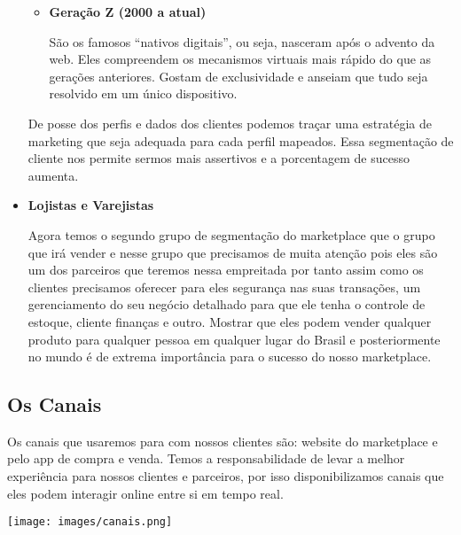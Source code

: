 \documentclass[a4paper]{article}
\begin{document}
\begin{itemize}
\begin{itemize}
        \item \textbf{Geração Z (2000  a atual)}
        \par São os famosos “nativos digitais”, ou seja, nasceram após o advento da web. Eles compreendem os mecanismos virtuais mais rápido do que as gerações anteriores. Gostam de exclusividade e anseiam que tudo seja resolvido em um único dispositivo.
    \end{itemize}
    \par De posse dos perfis e dados dos clientes podemos traçar uma estratégia de marketing que seja adequada para cada perfil mapeados. Essa segmentação de cliente nos permite sermos mais assertivos e a porcentagem de sucesso aumenta.
    \item \textbf{{Lojistas e Varejistas}}
    \par Agora temos o segundo grupo de segmentação do marketplace que o grupo que irá vender e nesse grupo que precisamos de muita atenção pois eles são um dos parceiros que teremos nessa empreitada por tanto assim como os clientes precisamos oferecer para eles segurança nas suas transações, um gerenciamento do seu negócio detalhado para que ele tenha o controle de estoque, cliente finanças e outro. Mostrar que eles podem vender qualquer produto para qualquer pessoa em qualquer lugar do Brasil e posteriormente no mundo é de extrema importância para o sucesso do nosso marketplace.
\end{itemize}
\subsection{Os Canais}
\par Os canais que usaremos para com nossos clientes são: website do marketplace e pelo app de compra e venda. Temos a responsabilidade de levar a melhor experiência para nossos clientes e parceiros, por isso disponibilizamos canais que eles podem interagir online entre si em tempo real.\\
\begin{center}
    \texttt{[image: images/canais.png]}
\end{center}
\end{document}
